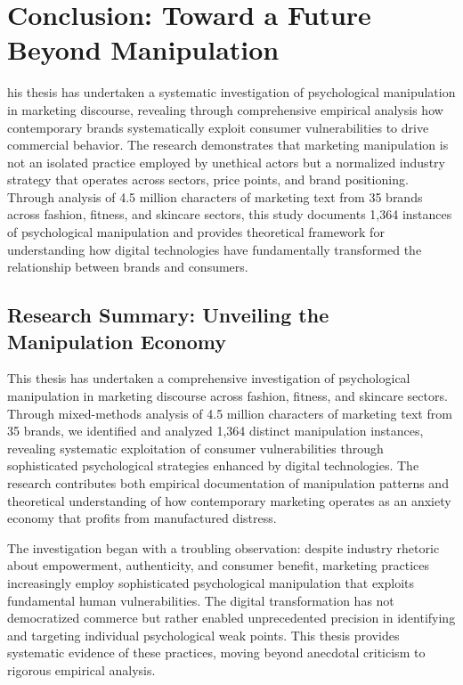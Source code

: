 
\chapter{Conclusion: Toward a Future Beyond Manipulation}
\label{ch:conclusion}

his thesis has undertaken a systematic investigation of psychological manipulation in marketing discourse, revealing through comprehensive empirical analysis how contemporary brands systematically exploit consumer vulnerabilities to drive commercial behavior. The research demonstrates that marketing manipulation is not an isolated practice employed by unethical actors but a normalized industry strategy that operates across sectors, price points, and brand positioning. Through analysis of 4.5 million characters of marketing text from 35 brands across fashion, fitness, and skincare sectors, this study documents 1,364 instances of psychological manipulation and provides theoretical framework for understanding how digital technologies have fundamentally transformed the relationship between brands and consumers.

\section{Research Summary: Unveiling the Manipulation Economy}
\label{sec:conclusion_summary}

This thesis has undertaken a comprehensive investigation of psychological manipulation in marketing discourse across fashion, fitness, and skincare sectors. Through mixed-methods analysis of 4.5 million characters of marketing text from 35 brands, we identified and analyzed 1,364 distinct manipulation instances, revealing systematic exploitation of consumer vulnerabilities through sophisticated psychological strategies enhanced by digital technologies. The research contributes both empirical documentation of manipulation patterns and theoretical understanding of how contemporary marketing operates as an anxiety economy that profits from manufactured distress.

The investigation began with a troubling observation: despite industry rhetoric about empowerment, authenticity, and consumer benefit, marketing practices increasingly employ sophisticated psychological manipulation that exploits fundamental human vulnerabilities. The digital transformation has not democratized commerce but rather enabled unprecedented precision in identifying and targeting individual psychological weak points. This thesis provides systematic evidence of these practices, moving beyond anecdotal criticism to rigorous empirical analysis.


